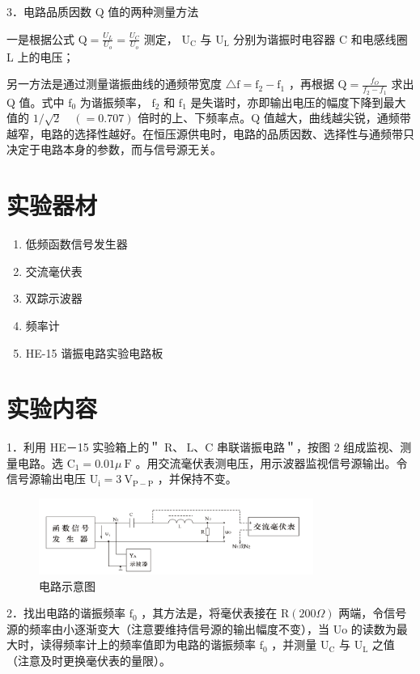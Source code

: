 \documentclass{article}
\begin{document}
3．电路品质因数 Q 值的两种测量方法

一是根据公式 $\mathrm{Q}=\frac{U_L}{U_o}=\frac{U_C}{U_o}$ 测定， $\mathrm{U}_{\mathrm{C}}$ 与 $\mathrm{U}_{\mathrm{L}}$ 分别为谐振时电容器 C 和电感线圈 L 上的电压；

另一方法是通过测量谐振曲线的通频带宽度 $\triangle \mathrm{f}=\mathrm{f}_2-\mathrm{f}_1$ ，再根据 $\mathrm{Q}=\frac{f_O}{f_2-f_1}$ 求出 Q 值。式中 $\mathrm{f}_0$ 为谐振频率， $\mathrm{f}_2$ 和 $\mathrm{f}_1$ 是失谐时，亦即输出电压的幅度下降到最大值的 $1 / \sqrt{2} \quad(=0.707)$ 倍时的上、下频率点。Q 值越大，曲线越尖锐，通频带越窄，电路的选择性越好。在恒压源供电时，电路的品质因数、选择性与通频带只决定于电路本身的参数，而与信号源无关。


\section{实验器材}
\label{sec:equipment}
    \begin{enumerate}
        \item 低频函数信号发生器 
        \item 交流毫伏表
        \item 双踪示波器
        \item 频率计 
        \item HE-15 谐振电路实验电路板 
    \end{enumerate} 

\section{实验内容}
1．利用 HE－15 实验箱上的＂ $\mathrm{R} 、 \mathrm{~L} 、 \mathrm{C}$ 串联谐振电路＂，按图 $2$ 组成监视、测量电路。选 $\mathrm{C}_1=0.01 \mu \mathrm{~F}$ 。用交流毫伏表测电压，用示波器监视信号源输出。令信号源输出电压 $\mathrm{U}_{\mathrm{i}}=3 \mathrm{~V}_{\mathrm{P}-\mathrm{P}}$ ，并保持不变。

\begin{figure}[h]
    \centering
    \includegraphics[width=0.8\textwidth]{img3.png}
    \caption{电路示意图}
    \label{fig:diff_circuit}
\end{figure}

2．找出电路的谐振频率 $\mathrm{f}_0$ ，其方法是，将毫伏表接在 $\mathrm{R}(200 \Omega)$ 两端，令信号源的频率由小逐渐变大（注意要维持信号源的输出幅度不变），当 Uo 的读数为最大时，读得频率计上的频率值即为电路的谐振频率 $\mathrm{f}_0$ ，并测量 $\mathrm{U}_{\mathrm{C}}$ 与 $\mathrm{U}_{\mathrm{L}}$ 之值（注意及时更换毫伏表的量限）。
\end{document}
